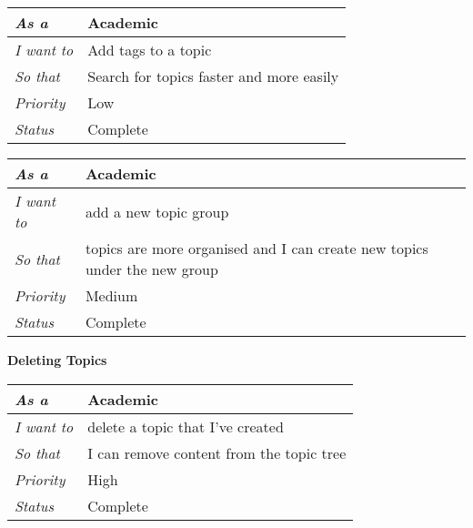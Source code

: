 \begin{table}[]
\begin{tabular}{|l|l|}
\hline
\textit{As a}      & Academic                                 \\ \hline
\textit{I want to} & Add tags to a topic                      \\ \hline
\textit{So that}   & Search for topics faster and more easily \\ \hline
\textit{Priority}  & {\color[HTML]{3531FF} Low}               \\ \hline
\textit{Status}    & Complete                                 \\ \hline
\end{tabular}
\end{table}

\begin{table}[]
\begin{tabular}{|l|l|}
\hline
\textit{As a}      & Academic                                                                      \\ \hline
\textit{I want to} & add a new topic group                                                     \\ \hline
\textit{So that}   & topics are more organised and I can create new topics under the new group \\ \hline
\textit{Priority}  & {\color[HTML]{F8A102} Medium}                                             \\ \hline
\textit{Status}    & Complete                                                                  \\ \hline
\end{tabular}
\end{table}

\textbf{Deleting Topics}

\begin{table}[]
\begin{tabular}{|l|l|}
\hline
\textit{As a}      & Academic                                 \\ \hline
\textit{I want to} & delete a topic that I've created         \\ \hline
\textit{So that}   & I can remove content from the topic tree \\ \hline
\textit{Priority}  & {\color[HTML]{FE0000} High}              \\ \hline
\textit{Status}    & Complete                                 \\ \hline
\end{tabular}
\end{table}

